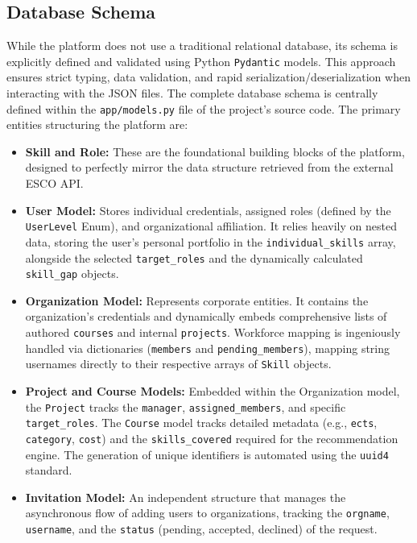 \documentclass{article}
\begin{document}
\subsection{Database Schema}
While the platform does not use a traditional relational database, its 
schema is explicitly defined 
and validated using Python \texttt{Pydantic} models. This approach ensures strict 
typing, data validation, and rapid serialization/deserialization when interacting 
with the JSON files. 
The complete database schema is centrally defined within the \texttt{app/models.py} 
file of the project's source code. The primary entities structuring the platform are:

\begin{itemize}
    \item \textbf{Skill and Role:} These are the foundational building blocks of 
    the platform, designed to perfectly mirror the data structure retrieved from 
    the external ESCO API. 
    \item \textbf{User Model:} Stores individual credentials, assigned roles 
    (defined by the \texttt{UserLevel} Enum), and organizational affiliation. 
    It relies heavily on nested data, storing the user's personal portfolio 
    in the \texttt{individual\_skills} array, alongside the selected 
    \texttt{target\_roles} and the dynamically calculated \texttt{skill\_gap} 
    objects.
    \item \textbf{Organization Model:} Represents corporate entities. It 
    contains the organization's credentials and dynamically embeds comprehensive 
    lists of authored \texttt{courses} and internal \texttt{projects}. 
    Workforce mapping is ingeniously handled via dictionaries (\texttt{members} 
    and \texttt{pending\_members}), mapping string usernames directly to their 
    respective arrays of \texttt{Skill} objects.
    \item \textbf{Project and Course Models:} Embedded within the Organization 
    model, the \texttt{Project} tracks the \texttt{manager}, 
    \texttt{assigned\_members}, and specific \texttt{target\_roles}. 
    The \texttt{Course} model tracks detailed metadata (e.g., \texttt{ects}, 
    \texttt{category}, \texttt{cost}) and the \texttt{skills\_covered} required 
    for the recommendation engine. The generation of unique identifiers is 
    automated using the \texttt{uuid4} standard.
    \item \textbf{Invitation Model:} An independent structure that manages 
    the asynchronous flow of adding users to organizations, tracking the 
    \texttt{orgname}, \texttt{username}, and the \texttt{status} (pending, 
    accepted, declined) of the request.
\end{itemize}
\end{document}
